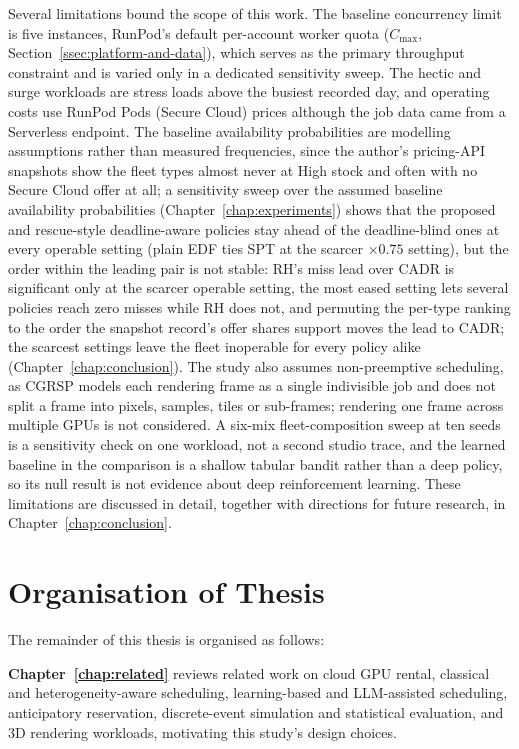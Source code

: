 Several limitations bound the scope of this work. The baseline concurrency limit is five instances, RunPod's default per-account worker quota ($C_{\max}$, Section~\ref{ssec:platform-and-data}), which serves as the primary throughput constraint and is varied only in a dedicated sensitivity sweep. The hectic and surge workloads are stress loads above the busiest recorded day, and operating costs use RunPod Pods (Secure Cloud) prices although the job data came from a Serverless endpoint. The baseline availability probabilities are modelling assumptions rather than measured frequencies, since the author's pricing-API snapshots show the fleet types almost never at High stock and often with no Secure Cloud offer at all; a sensitivity sweep over the assumed baseline availability probabilities (Chapter~\ref{chap:experiments}) shows that the proposed and rescue-style deadline-aware policies stay ahead of the deadline-blind ones at every operable setting (plain EDF ties SPT at the scarcer $\times0.75$ setting), but the order within the leading pair is not stable: RH's miss lead over CADR is significant only at the scarcer operable setting, the most eased setting lets several policies reach zero misses while RH does not, and permuting the per-type ranking to the order the snapshot record's offer shares support moves the lead to CADR; the scarcest settings leave the fleet inoperable for every policy alike (Chapter~\ref{chap:conclusion}). The study also assumes non-preemptive scheduling, as CGRSP models each rendering frame as a single indivisible job and does not split a frame into pixels, samples, tiles or sub-frames; rendering one frame across multiple GPUs is not considered. A six-mix fleet-composition sweep at ten seeds is a sensitivity check on one workload, not a second studio trace, and the learned baseline in the comparison is a shallow tabular bandit rather than a deep policy, so its null result is not evidence about deep reinforcement learning. These limitations are discussed in detail, together with directions for future research, in Chapter~\ref{chap:conclusion}.

\section{Organisation of Thesis}
\label{sec:organisation-of-thesis}

The remainder of this thesis is organised as follows:

\textbf{Chapter~\ref{chap:related}} reviews related work on cloud GPU rental, classical and heterogeneity-aware scheduling, learning-based and LLM-assisted scheduling, anticipatory reservation, discrete-event simulation and statistical evaluation, and 3D rendering workloads, motivating this study's design choices.

